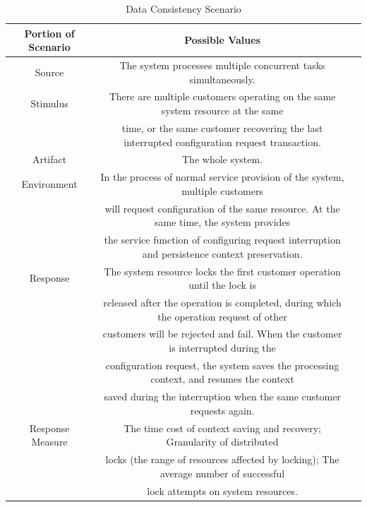 \documentclass{article}
\begin{document}
	\begin{center}
		\begin{table}[!htb]
		\begin{tabular}{ccc}
		\toprule  
		Portion of Scenario & Possible Values\\
		\midrule 
		Source & The system processes multiple concurrent tasks simultaneously.\\
		Stimulus & There are multiple customers operating on the same system resource at the same \\
		& time, or the same customer recovering the last interrupted configuration request transaction.\\
		Artifact & The whole system. \\
		Environment & In the process of normal service provision of the system, multiple customers \\
		& will request configuration of the same resource. At the same time, the system provides \\
		& the service function of configuring request interruption and persistence context preservation.\\
		Response & The system resource locks the first customer operation until the lock is \\
		& released after the operation is completed, during which the operation request of other \\
		& customers will be rejected and fail. When the customer is interrupted during the \\
		& configuration request, the system saves the processing context, and resumes the context\\
		& saved during the interruption when the same customer requests again.\\
		Response Measure & The time cost of context saving and recovery; Granularity of distributed \\
		& locks (the range of resources affected by locking); The average number of successful \\
		& lock attempts on system resources.\\
		\bottomrule
		\end{tabular}
		\caption{Data Consistency Scenario}
		\end{table}
	\end{center}
\end{document}
